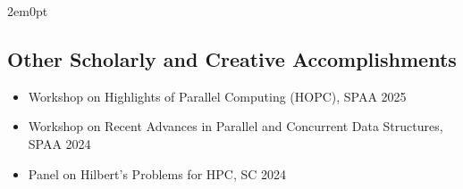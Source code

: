\begin{adjustwidth}{2em}{0pt}
\end{adjustwidth}


\subsection{Other Scholarly and Creative Accomplishments}

\begin{itemize}
\item Workshop on Highlights of Parallel Computing (HOPC), SPAA 2025
\item Workshop on Recent Advances in Parallel and Concurrent Data Structures,
SPAA 2024
\item Panel on Hilbert's Problems for HPC, SC 2024
\end{itemize}

